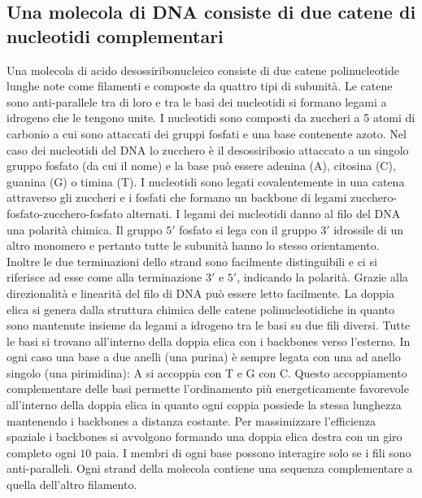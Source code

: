 \subsection{Una molecola di DNA consiste di due catene di nucleotidi complementari}
Una molecola di acido desossiribonucleico consiste di due catene polinucleotide lunghe note come filamenti e composte da quattro tipi di subunit\`a. Le catene sono anti-parallele tra di loro
e tra le basi dei nucleotidi si formano legami a idrogeno che le tengono unite. I nucleotidi sono composti da zuccheri a 5 atomi di carbonio a cui sono attaccati dei gruppi fosfati e 
una base contenente azoto. Nel caso dei nucleotidi del DNA lo zucchero \`e il desossiribosio attaccato a un singolo gruppo fosfato (da cui il nome) e la base pu\`o essere adenina
(A), citosina (C), guanina (G) o timina (T). I nucleotidi sono legati covalentemente in una catena attraverso gli zuccheri e i fosfati che formano un backbone di legami 
zucchero-fosfato-zucchero-fosfato alternati. I legami dei nucleotidi danno al filo del DNA una polarit\`a chimica. Il gruppo $5'$ fosfato si lega con il gruppo $3'$ idrossile di un
altro monomero e pertanto tutte le subunit\`a hanno lo stesso orientamento. Inoltre le due terminazioni dello strand sono facilmente distinguibili e ci si riferisce ad esse come alla
terminazione $3'$ e $5'$, indicando la polarit\`a. Grazie alla direzionalit\`a e linearit\`a del filo di DNA pu\`o essere letto facilmente. La doppia elica si genera dalla struttura 
chimica delle catene polinucleotidiche in quanto sono mantenute insieme da legami a idrogeno tra le basi su due fili diversi. Tutte le basi si trovano all'interno della doppia elica con i 
backbones verso l'esterno. In ogni caso una base a due anelli (una purina) \`e sempre legata con una ad anello singolo (una pirimidina): A si accoppia con T e G con C. Questo 
accoppiamento complementare delle basi permette l'ordinamento pi\`u energeticamente favorevole all'interno della doppia elica in quanto ogni
coppia possiede la stessa lunghezza mantenendo i backbones a distanza costante. Per massimizzare l'efficienza spaziale i backbones si avvolgono formando una doppia elica destra con
un giro completo ogni $10$ paia. I membri di ogni base possono interagire solo se i fili sono anti-paralleli. Ogni strand della molecola contiene una sequenza complementare a
quella dell'altro filamento. 
